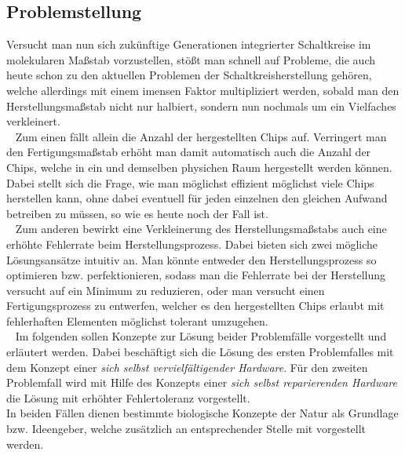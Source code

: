 \documentclass[12p, a4]{article}
\begin{document}
\subsection{Problemstellung}
Versucht man nun sich zukünftige Generationen integrierter Schaltkreise
im molekularen Maßstab vorzustellen, stößt man schnell auf Probleme,
die auch heute schon zu den aktuellen Problemen der Schaltkreisherstellung
gehören, welche allerdings mit einem imensen Faktor multipliziert werden,
sobald man den Herstellungsmaßstab nicht nur halbiert, sondern nun nochmals
um ein Vielfaches verkleinert.\\
\ \newline
Zum einen fällt allein die Anzahl der hergestellten Chips auf. Verringert
man den Fertigungsmaßstab erhöht man damit automatisch auch die Anzahl
der Chips, welche in ein und demselben physichen Raum hergestellt werden
können. Dabei stellt sich die Frage, wie man möglichst effizient möglichst
viele Chips herstellen kann, ohne dabei eventuell für jeden einzelnen den
gleichen Aufwand betreiben zu müssen, so wie es heute noch der Fall ist.\\
\ \newline
Zum anderen bewirkt eine Verkleinerung des Herstellungsmaßstabs auch eine
erhöhte Fehlerrate beim Herstellungsprozess. Dabei bieten sich zwei
mögliche Lösungsansätze intuitiv an. Man könnte entweder den
Herstellungsprozess so optimieren bzw. perfektionieren, sodass man die
Fehlerrate bei der Herstellung versucht auf ein Minimum zu reduzieren,
oder man versucht einen Fertigungsprozess zu entwerfen, welcher es den
hergestellten Chips erlaubt mit fehlerhaften Elementen möglichst tolerant
umzugehen.\\
\ \newline
Im folgenden sollen Konzepte zur Lösung beider Problemfälle vorgestellt und
erläutert werden. Dabei beschäftigt sich die Lösung des ersten Problemfalles
mit dem Konzept einer \textit{sich selbst vervielfältigender Hardware}.
Für den zweiten Problemfall wird mit Hilfe des Konzepts einer \textit{sich selbst
reparierenden Hardware} die Lösung mit erhöhter Fehlertoleranz vorgestellt.\\
In beiden Fällen dienen bestimmte biologische Konzepte der Natur als
Grundlage bzw. Ideengeber, welche zusätzlich an entsprechender Stelle mit
vorgestellt werden.
\ \newline
\end{document}
